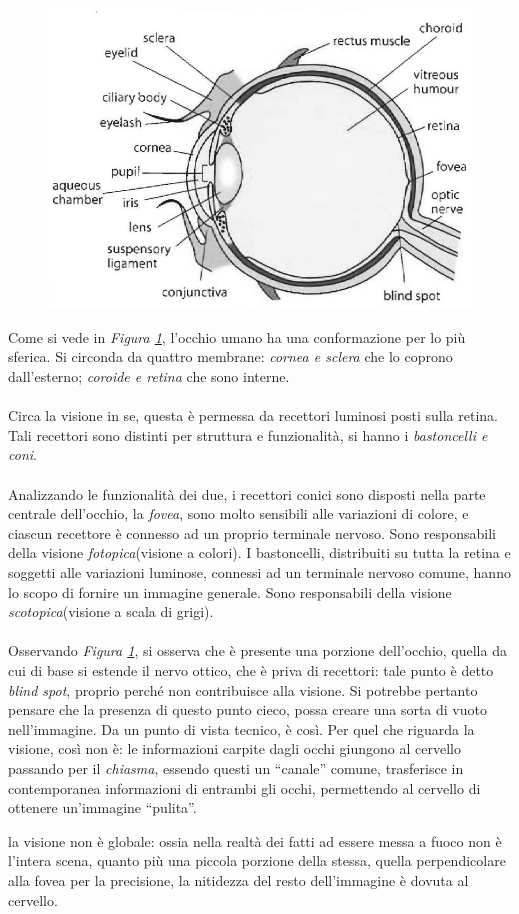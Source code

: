 \documentclass{subfiles}
\begin{document}
\begin{figure}
    \includegraphics[scale = 0.425]{Images/Human Eye.png}
    \label{Fig:1.1}
\end{figure}

Come si vede in \emph{Figura \ref{Fig:1.1}}, l'occhio umano ha una conformazione per lo più sferica.
Si circonda da quattro membrane: \emph{cornea \emph{e} sclera} che lo coprono dall'esterno; \emph{coroide \emph{e} retina} che sono interne.
\\ \\
Circa la visione in se, questa è permessa da recettori luminosi posti sulla retina.
Tali recettori sono distinti per struttura e funzionalità, si hanno i \emph{bastoncelli \emph{e} coni}.
\\ \\
Analizzando le funzionalità dei due, i recettori conici sono disposti nella parte centrale dell'occhio, la \emph{fovea}, sono molto sensibili alle variazioni di colore,
e ciascun recettore è connesso ad un proprio terminale nervoso. Sono responsabili della visione \emph{fotopica}(visione a colori).
I bastoncelli, distribuiti su tutta la retina e soggetti alle variazioni luminose, connessi ad un terminale nervoso comune, hanno lo scopo di fornire un immagine generale.
Sono responsabili della visione \emph{scotopica}(visione a scala di grigi).
\\ \\
Osservando \emph{Figura \ref{Fig:1.1}}, si osserva che è presente una porzione dell'occhio, quella da cui di base si estende il nervo ottico,
che è priva di recettori: tale punto è detto \emph{blind spot}, proprio perché non contribuisce alla visione.
Si potrebbe pertanto pensare che la presenza di questo punto cieco, possa creare una sorta di vuoto nell'immagine.
Da un punto di vista tecnico, è così. Per quel che riguarda la visione, così non è: le informazioni carpite dagli occhi giungono al cervello passando per il \emph{chiasma},
essendo questi un ``canale'' comune, trasferisce in contemporanea informazioni di entrambi gli occhi, permettendo al cervello di ottenere un'immagine ``pulita''.

\begin{Remark*}
    la visione non è globale: ossia nella realtà dei fatti ad essere messa a fuoco non è l'intera scena, quanto più una piccola porzione della stessa,
    quella perpendicolare alla fovea per la precisione, la nitidezza del resto dell'immagine è dovuta al cervello.
\end{Remark*}
\end{document}

